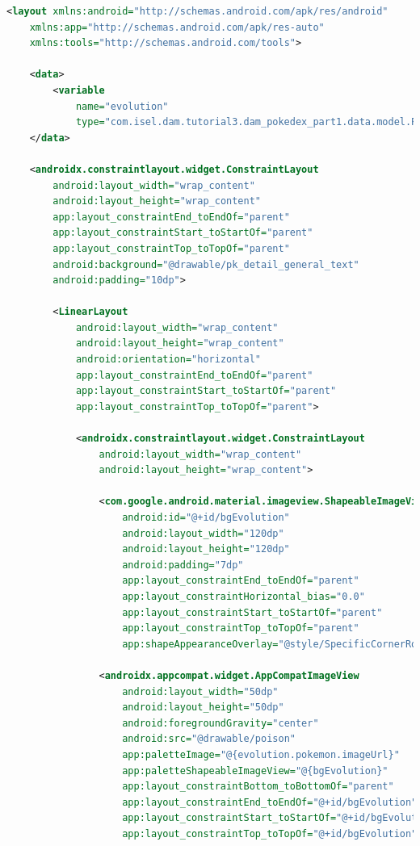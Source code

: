 \documentclass[a4paper, 12pt]{article}
\begin{document}
\begin{lstlisting}[caption={Pokemon Evolution Item Layout.}, label={layout:pk_evolution}, language=XML]
    <layout xmlns:android="http://schemas.android.com/apk/res/android"
    xmlns:app="http://schemas.android.com/apk/res-auto"
    xmlns:tools="http://schemas.android.com/tools">

    <data>
        <variable
            name="evolution"
            type="com.isel.dam.tutorial3.dam_pokedex_part1.data.model.PokemonEvolution" />
    </data>

    <androidx.constraintlayout.widget.ConstraintLayout
        android:layout_width="wrap_content"
        android:layout_height="wrap_content"
        app:layout_constraintEnd_toEndOf="parent"
        app:layout_constraintStart_toStartOf="parent"
        app:layout_constraintTop_toTopOf="parent"
        android:background="@drawable/pk_detail_general_text"
        android:padding="10dp">

        <LinearLayout
            android:layout_width="wrap_content"
            android:layout_height="wrap_content"
            android:orientation="horizontal"
            app:layout_constraintEnd_toEndOf="parent"
            app:layout_constraintStart_toStartOf="parent"
            app:layout_constraintTop_toTopOf="parent">

            <androidx.constraintlayout.widget.ConstraintLayout
                android:layout_width="wrap_content"
                android:layout_height="wrap_content">

                <com.google.android.material.imageview.ShapeableImageView
                    android:id="@+id/bgEvolution"
                    android:layout_width="120dp"
                    android:layout_height="120dp"
                    android:padding="7dp"
                    app:layout_constraintEnd_toEndOf="parent"
                    app:layout_constraintHorizontal_bias="0.0"
                    app:layout_constraintStart_toStartOf="parent"
                    app:layout_constraintTop_toTopOf="parent"
                    app:shapeAppearanceOverlay="@style/SpecificCornerRounded" />

                <androidx.appcompat.widget.AppCompatImageView
                    android:layout_width="50dp"
                    android:layout_height="50dp"
                    android:foregroundGravity="center"
                    android:src="@drawable/poison"
                    app:paletteImage="@{evolution.pokemon.imageUrl}"
                    app:paletteShapeableImageView="@{bgEvolution}"
                    app:layout_constraintBottom_toBottomOf="parent"
                    app:layout_constraintEnd_toEndOf="@+id/bgEvolution"
                    app:layout_constraintStart_toStartOf="@+id/bgEvolution"
                    app:layout_constraintTop_toTopOf="@+id/bgEvolution">


\end{lstlisting}
\end{document}
